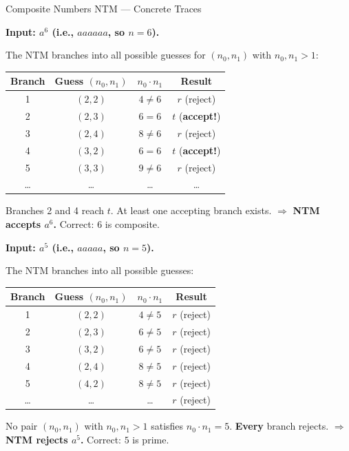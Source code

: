 \begin{examplebox}{Composite Numbers NTM --- Concrete Traces}

\textbf{Input: $a^6$ (i.e., $aaaaaa$, so $n = 6$).}

The NTM branches into all possible guesses for $(n_0, n_1)$ with
$n_0, n_1 > 1$:

\begin{center}
\renewcommand{\arraystretch}{1.3}
\begin{tabular}{cccc}
\toprule
\textbf{Branch} & \textbf{Guess $(n_0, n_1)$} & \textbf{$n_0 \cdot n_1$} &
\textbf{Result} \\
\midrule
1 & $(2, 2)$ & $4 \neq 6$ & $r$ (reject) \\
2 & $(2, 3)$ & $6 = 6$ & $t$ (\textbf{accept!}) \\
3 & $(2, 4)$ & $8 \neq 6$ & $r$ (reject) \\
4 & $(3, 2)$ & $6 = 6$ & $t$ (\textbf{accept!}) \\
5 & $(3, 3)$ & $9 \neq 6$ & $r$ (reject) \\
\ldots & \ldots & \ldots & \ldots \\
\bottomrule
\end{tabular}
\end{center}

Branches 2 and 4 reach $t$. At least one accepting branch exists.
$\Rightarrow$ \textbf{NTM accepts $a^6$.} Correct: $6$ is composite.

\bigskip

\textbf{Input: $a^5$ (i.e., $aaaaa$, so $n = 5$).}

The NTM branches into all possible guesses:

\begin{center}
\renewcommand{\arraystretch}{1.3}
\begin{tabular}{cccc}
\toprule
\textbf{Branch} & \textbf{Guess $(n_0, n_1)$} & \textbf{$n_0 \cdot n_1$} &
\textbf{Result} \\
\midrule
1 & $(2, 2)$ & $4 \neq 5$ & $r$ (reject) \\
2 & $(2, 3)$ & $6 \neq 5$ & $r$ (reject) \\
3 & $(3, 2)$ & $6 \neq 5$ & $r$ (reject) \\
4 & $(2, 4)$ & $8 \neq 5$ & $r$ (reject) \\
5 & $(4, 2)$ & $8 \neq 5$ & $r$ (reject) \\
\ldots & \ldots & \ldots & $r$ (reject) \\
\bottomrule
\end{tabular}
\end{center}

No pair $(n_0, n_1)$ with $n_0, n_1 > 1$ satisfies $n_0 \cdot n_1 = 5$.
\textbf{Every} branch rejects. $\Rightarrow$ \textbf{NTM rejects $a^5$.}
Correct: $5$ is prime.

\end{examplebox}

